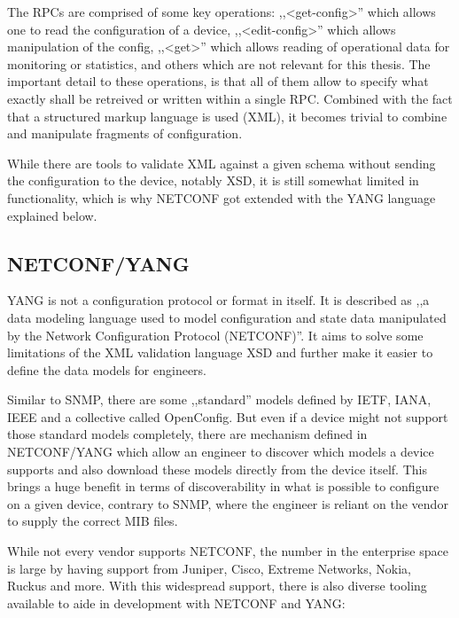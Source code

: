 The \acrshort{RPC}s are comprised of some key operations: ,,<get-config>'' which allows one to read
the configuration of a device, ,,<edit-config>'' which allows manipulation of the config, ,,<get>''
which allows reading of operational data for monitoring or statistics, and others which are not
relevant for this thesis. 
The important detail to these operations, is that all of them allow to specify what exactly shall
be retreived or written within a single \acrshort{RPC}. Combined with the fact that a structured
markup language is used (XML), it becomes trivial to combine and manipulate fragments of configuration.

While there are tools to validate XML against a given schema without sending the configuration to the device,
notably \acrfull{XSD}, it is still somewhat limited in functionality, 
which is why NETCONF got extended with the YANG language explained below.

\subsection{NETCONF/YANG}

YANG is not a configuration protocol or format in itself.
It is described as ,,a data modeling language used to model configuration and
state data manipulated by the Network Configuration Protocol (NETCONF)''.
It aims to solve some limitations of the XML validation language XSD and further make it
easier to define the data models for engineers.


Similar to SNMP, there are some ,,standard'' models defined by \acrshort{IETF}, IANA, IEEE
and a collective called OpenConfig. But even if a device might not support those standard
models completely, there are mechanism defined in NETCONF/YANG which allow an engineer
to discover which models a device supports and also download these models directly from the
device itself. This brings a huge benefit in terms of discoverability in what is possible
to configure on a given device, contrary to SNMP, where the engineer is reliant on
the vendor to supply the correct MIB files.

While not every vendor supports NETCONF, the number in the enterprise space is large by
having support from Juniper, Cisco, Extreme Networks, Nokia, Ruckus and more.
With this widespread support, there is also diverse tooling available to aide in development
with NETCONF and YANG:

